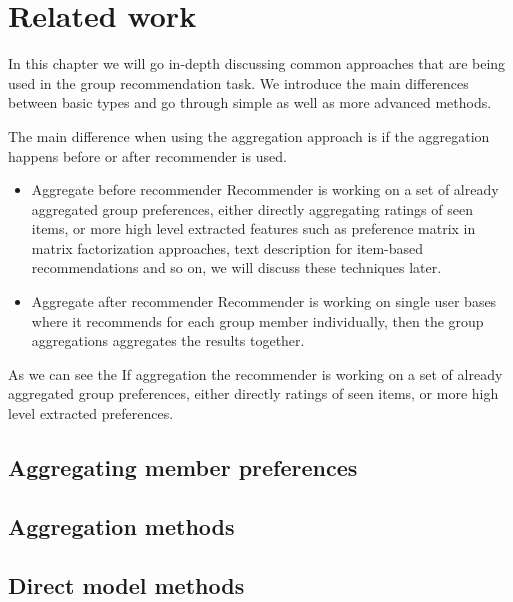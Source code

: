 \chapter{Related work} \label{chap_related_work}
In this chapter we will go in-depth discussing common approaches that are being used in the group recommendation task. We introduce the main differences between basic types  and go through simple as well as more advanced methods.\newline

The main difference when using the aggregation approach is if the aggregation happens before or after recommender is used.
\begin{itemize}
    \item Aggregate before recommender \newline
    Recommender is working on a set of already aggregated group preferences, either directly aggregating ratings of seen items, or more high level extracted features such as preference matrix in matrix factorization approaches, text description for item-based recommendations and so on, we will discuss these techniques later.
    \item Aggregate after recommender \newline
    Recommender is working on single user bases where it recommends for each group member individually, then the group aggregations aggregates the results together.
\end{itemize}

As we can see the
If aggregation the recommender is working on a set of already aggregated group preferences, either directly ratings of seen items, or more high level extracted preferences.

\section{Aggregating member preferences}

\section{Aggregation methods}

\section{Direct model methods}